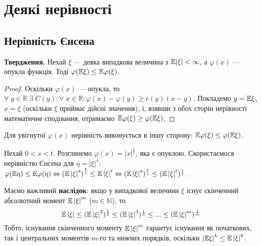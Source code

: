 \section{Деякі нерівності}
\subsection{Нерівність Єнсена}

\noindent\textbf{Твердження.} Нехай $\xi$ --- деяка випадкова величина
з $\mathbb{E}|\xi| < \infty$, а $\varphi(x)$ --- опукла функція. Тоді $\varphi(\mathbb{E}\xi) \leq \mathbb{E}\varphi(\xi)$.
\begin{proof}
    Оскільки $\varphi(x)$ --- опукла, то $\forall \; y \in \mathbb{R} \;\exists \; C(y): \forall \; x \in \mathbb{R}: \varphi(x) - \varphi(y) \geq c(y)(x-y)$.
    Покладемо $y = \mathbb{E}\xi$, $x = \xi$ (оскільки $\xi$ приймає дійсні значення), і, взявши з обох сторін нерівності математичне сподівання,
    отримаємо $\mathbb{E}\varphi(\xi) \geq \varphi(\mathbb{E}\xi)$. 
\end{proof}
\begin{remark}
    Для увігнутої $\varphi(x)$ нерівність виконується в іншу сторону: $\mathbb{E}\varphi(\xi) \leq \varphi(\mathbb{E}\xi)$.
\end{remark}
\begin{example}
    Нехай $0 < s < t$. Розглянемо $\varphi(x) = |x|^{\frac{t}{s}}$, яка є опуклою. Скористаємося нерівністю
    Єнсена для $\eta = \left| \xi\right|^s$:
    $\varphi(\mathbb{E}\eta) \leq \mathbb{E}\varphi(\eta) \Leftrightarrow \left( \mathbb{E} \left| \xi\right|^s\right)^{\frac{t}{s}} \leq \mathbb{E} \left| \xi\right|^t 
    \Leftrightarrow ( \mathbb{E} \left| \xi\right|^s)^{\frac{1}{s}} \leq ( \mathbb{E} \left| \xi\right|^t)^{\frac{1}{t}}$.

    Маємо важливий \textbf{наслідок}: якщо у випадкової величини $\xi$ існує скінченний абсолютний момент $\mathbb{E}\left|\xi\right|^m$ ($m\in \mathbb{N}$), то
    \begin{equation}\label{eq:moments_ineq}
        \mathbb{E} \left| \xi\right| \leq (\mathbb{E} \left| \xi\right|^2)^{\frac{1}{2}} \leq (\mathbb{E} \left| \xi\right|^3)^{\frac{1}{3}} \leq ... \leq ( \mathbb{E} \left| \xi\right|^m)^{\frac{1}{m}}    
    \end{equation}
    Тобто, існування скінченного моменту $\mathbb{E}\left|\xi\right|^m$ гарантує існування як початкових, так і центральних моментів $m$-го та нижчих порядків,
    оскільки $\left| \mathbb{E}\xi \right|^k \leq \mathbb{E}\left|\xi\right|^k$.
\end{example}

